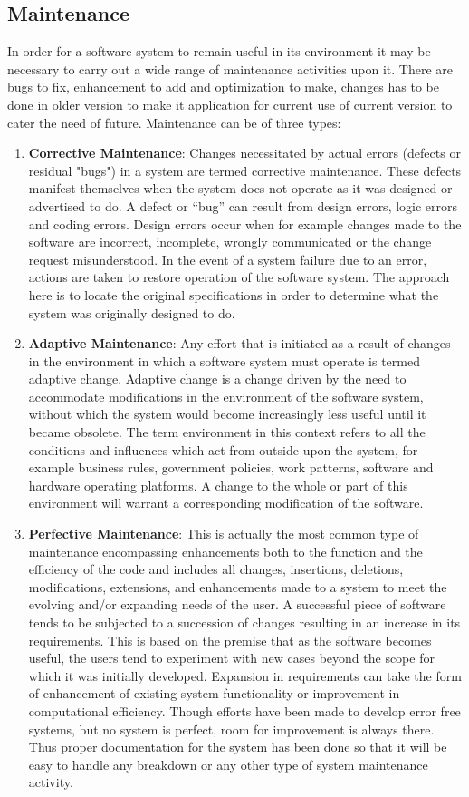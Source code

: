 \subsection{Maintenance}
In order for a software system to remain useful in its environment it 
may be necessary to carry out a wide range of maintenance activities 
upon it. There are bugs to fix, enhancement to add and optimization to 
make, changes has to be done in older version to make it application 
for current use of current version to cater the need of future. 
Maintenance can be of three types:\\
\begin{enumerate}
\item {\bf{Corrective Maintenance}}: Changes necessitated by actual errors 
(defects or residual "bugs") in a system are termed corrective 
maintenance. These defects manifest themselves when the system does not
operate as it was designed or advertised to do. A defect or “bug” can 
result from design errors, logic errors and coding errors. Design errors 
occur when for example changes made to the software are incorrect, 
incomplete, wrongly communicated or the change request misunderstood. 
In the event of a system failure due to an error, actions are taken to 
restore operation of the software system. The approach here is to locate 
the original specifications in order to determine what the system was 
originally designed to do.
\item {\bf{Adaptive Maintenance}}: Any effort that is initiated as a result of 
changes in the environment in which a software system must operate is 
termed adaptive change. Adaptive change is a change driven by the need
to accommodate modifications in the environment of the software system, 
without which the system would become increasingly less useful until it 
became obsolete. The term environment in this context refers to all the 
conditions and influences which act from outside upon the system, for 
example business rules, government policies, work patterns, software 
and hardware operating platforms. A change to the whole or part of this 
environment will warrant a corresponding modification of the software.
\item {\bf{Perfective Maintenance}}: This is actually the most common type of 
maintenance encompassing enhancements both to the function and the 
efficiency of the code and includes all changes, insertions, deletions, 
modifications, extensions, and enhancements made to a system to meet 
the evolving and/or expanding needs of the user. A successful piece of 
software tends to be subjected to a succession of changes resulting in 
an increase in its requirements. This is based on the premise that as 
the software becomes useful, the users tend to experiment with new 
cases beyond the scope for which it was initially developed. Expansion 
in requirements can take the form of enhancement of existing system 
functionality or improvement in computational efficiency. Though 
efforts have been made to develop error free systems, but no system is 
perfect, room for improvement is always there. Thus proper documentation 
for the system has been done so that it will be easy to handle any 
breakdown or any other type of system maintenance activity.


\end{enumerate}
